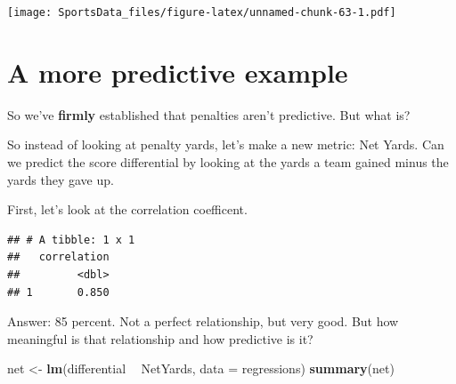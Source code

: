 \documentclass[
]{book}
\newenvironment{Shaded}{\begin{snugshade}}{\end{snugshade}}
\newcommand{\DataTypeTok}[1]{\textcolor[rgb]{0.13,0.29,0.53}{#1}}
\newcommand{\KeywordTok}[1]{\textcolor[rgb]{0.13,0.29,0.53}{\textbf{#1}}}
\newcommand{\NormalTok}[1]{#1}
\newcommand{\OperatorTok}[1]{\textcolor[rgb]{0.81,0.36,0.00}{\textbf{#1}}}
\newcommand{\StringTok}[1]{\textcolor[rgb]{0.31,0.60,0.02}{#1}}
\begin{document}
\texttt{[image: SportsData\_files/figure-latex/unnamed-chunk-63-1.pdf]}

\hypertarget{a-more-predictive-example}{%
\section{A more predictive example}\label{a-more-predictive-example}}

So we've \textbf{firmly} established that penalties aren't predictive. But what is?

So instead of looking at penalty yards, let's make a new metric: Net Yards. Can we predict the score differential by looking at the yards a team gained minus the yards they gave up.

\begin{Shaded}
\end{Shaded}

First, let's look at the correlation coefficent.

\begin{Shaded}
\end{Shaded}

\begin{verbatim}
## # A tibble: 1 x 1
##   correlation
##         <dbl>
## 1       0.850
\end{verbatim}

Answer: 85 percent. Not a perfect relationship, but very good. But how meaningful is that relationship and how predictive is it?

\begin{Shaded}
\begin{Highlighting}[]
\NormalTok{net <-}\StringTok{ }\KeywordTok{lm}\NormalTok{(differential }\OperatorTok{~}\StringTok{ }\NormalTok{NetYards, }\DataTypeTok{data =}\NormalTok{ regressions)}
\KeywordTok{summary}\NormalTok{(net)}
\end{Highlighting}
\end{Shaded}
\end{document}
